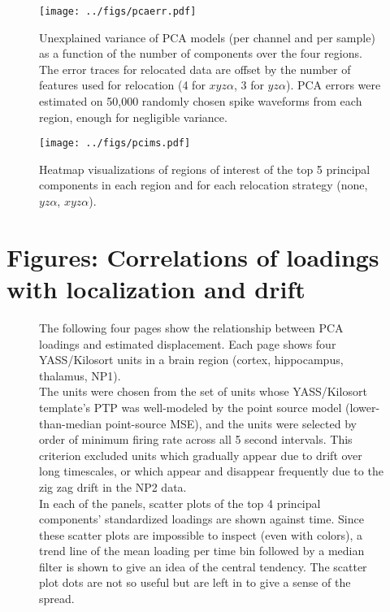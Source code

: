 \documentclass[
  12pt,
]{article}
\theoremstyle{plain}
\theoremstyle{definition}
\theoremstyle{remark}
\newcommand{\1}[1]{\mathbb{1}_{{#1}}}
\begin{document}
\begin{figure}
\begin{center}
\texttt{[image: ../figs/pcaerr.pdf]}
\caption{Unexplained variance of PCA models (per channel and per sample) as a function of the number of components over the four regions. The error traces for relocated data are offset by the number of features used for relocation (4 for $xyz\alpha$, 3 for $yz\alpha$). PCA errors were estimated on 50,000 randomly chosen spike waveforms from each region, enough for negligible variance.}
\label{fig:pcaerr}
\end{center}
\end{figure}

\begin{figure}
\begin{center}
\texttt{[image: ../figs/pcims.pdf]}
\caption{Heatmap visualizations of regions of interest of the top 5 principal components in each region and for each relocation strategy (none, $yz\alpha$, $xyz\alpha$).}
\label{fig:pcaims}
\end{center}
\end{figure}

\FloatBarrier
\newpage
\section{Figures: Correlations of loadings with localization and drift}

\begin{figure}[H]
\caption{The following four pages show the relationship between PCA loadings and estimated displacement. Each page shows four YASS/Kilosort units in a brain region (cortex, hippocampus, thalamus, NP1).
\\
The units were chosen from the set of units whose YASS/Kilosort template's PTP was well-modeled by the point source model (lower-than-median point-source MSE), and the units were selected by order of minimum firing rate across all 5 second intervals. This criterion excluded units which gradually appear due to drift over long timescales, or which appear and disappear frequently due to the zig zag drift in the NP2 data.
\\
In each of the panels, scatter plots of the top 4 principal components' standardized loadings are shown against time. Since these scatter plots are impossible to inspect (even with colors), a trend line of the mean loading per time bin followed by a median filter is shown to give an idea of the central tendency. The scatter plot dots are not so useful but are left in to give a sense of the spread.}
\label{fig:traces}
\end{figure}
\end{document}
